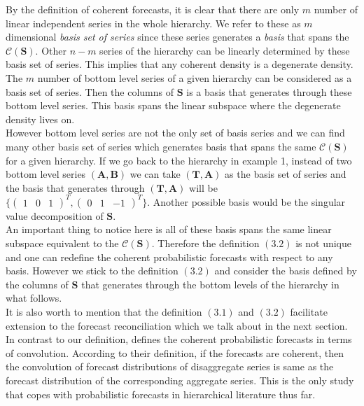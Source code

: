 \documentclass[a4paper, 11pt]{article}
\begin{document}
\noindent
By the definition of coherent forecasts, it is clear that there are only $m$ number of linear independent series in the whole hierarchy. We refer to these as $m$ dimensional \textit{basis set of series} since these series generates a \textit{basis} that spans the $\mathscr{C}(\bm{S})$. Other $n-m$ series of the hierarchy can be linearly determined by these basis set of series. This implies that any coherent density is a degenerate density. The $m$ number of bottom level series of a given hierarchy can be considered as a basis set of series. Then the columns of $\bm{S}$ is a basis that generates through these bottom level series. This basis spans the linear subspace where the degenerate density lives on.\\

\noindent
However bottom level series are not the only set of basis series and we can find many other basis set of series which generates basis that spans the same $\mathscr{C}(\bm{S})$ for a given hierarchy. If we go back to the hierarchy in example 1, instead of two bottom level series $(\bm{A,B})$ we can take $(\bm{T,A})$ as the basis set of series and the basis that generates through $(\bm{T,A})$ will be $\{\begin{pmatrix}
1&0&1 \end{pmatrix}^T, \begin{pmatrix}
0&1&-1 \end{pmatrix}^T\}$. Another possible basis would be the singular value decomposition of $\bm{S}$.\\

\noindent
An important thing to notice here is all of these basis spans the same linear subspace equivalent to the $\mathscr{C}(\bm{S})$. Therefore the definition $(3.2)$ is not unique and one can redefine the coherent probabilistic forecasts with respect to any basis. However we stick to the definition $(3.2)$ and consider the basis defined by the columns of $\bm{S}$ that generates through the bottom levels of the hierarchy in what follows.\\ 

\noindent
It is also worth to mention that the definition $(3.1)$ and $(3.2)$ facilitate extension to the forecast reconciliation which we talk about in the next section. In contrast to our definition, \citet{BenTaieb2017} defines the coherent probabilistic forecasts in terms of convolution. According to their definition, if the forecasts are coherent, then the convolution of forecast distributions of disaggregate series is same as the forecast distribution of the corresponding aggregate series. This is the only study that copes with probabilistic forecasts in hierarchical literature thus far. 
\end{document}
